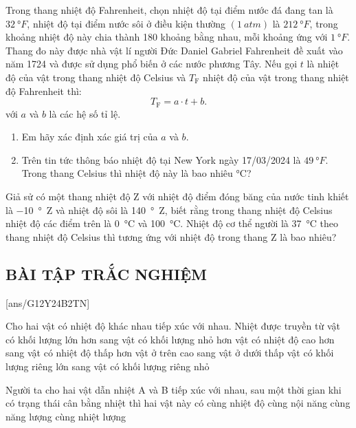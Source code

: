 \begin{vd}
	Trong thang nhiệt độ Fahrenheit, chọn nhiệt độ tại điểm nước đá đang tan là $\SI{32}{\degree F}$, nhiệt độ tại điểm nước sôi ở điều kiện thường $\left(\SI{1}{atm}\right)$ là $\SI{212}{\degree F}$, trong khoảng nhiệt độ này chia thành 180 khoảng bằng nhau, mỗi khoảng ứng với $\SI{1}{\degree F}$. Thang đo này được nhà vật lí người Đức Daniel Gabriel Fahrenheit đề xuất vào năm 1724 và được sử dụng phổ biến ở các nước phương Tây. Nếu gọi $t$ là nhiệt độ của vật trong thang nhiệt độ Celsius và $T_\text{F}$ nhiệt độ của vật trong thang nhiệt độ Fahrenheit thì:
	$$T_\text{F}=a\cdot t+b.$$
	với $a$ và $b$ là các hệ số tỉ lệ.
	\begin{enumerate}[label=\alph*)]
		\item Em hãy xác định xác giá trị của $a$ và $b$.
		\item Trên tin tức thông báo nhiệt độ tại New York ngày 17/03/2024 là $\SI{49}{\degree F}$. Trong thang Celsius thì nhiệt độ này là bao nhiêu $\si{\celsius}$?
	\end{enumerate}
\end{vd}
\begin{vd}
	Giả sử có một thang nhiệt độ Z với nhiệt độ điểm đóng băng của nước tinh khiết là \SI{-10}{\degree Z} và nhiệt độ sôi là \SI{140}{\degree Z}, biết rằng trong thang nhiệt độ Celsius nhiệt độ các điểm trên là \SI{0}{\celsius} và \SI{100}{\celsius}. Nhiệt độ cơ thể người là \SI{37}{\celsius} theo thang nhiệt độ Celsius thì tương ứng với nhiệt độ trong thang Z là bao nhiêu?
 \end{vd}
\subsection{BÀI TẬP TRẮC NGHIỆM}
[ans/G12Y24B2TN]
\begin{ex}
	Cho hai vật có nhiệt độ khác nhau tiếp xúc với nhau. Nhiệt được truyền từ
	\choice
	{vật có khối lượng lớn hơn sang vật có khối lượng nhỏ hơn}
	{\True vật có nhiệt độ cao hơn sang vật có nhiệt độ thấp hơn}
	{vật ở trên cao sang vật ở dưới thấp}
	{vật có khối lượng riêng lớn sang vật có khối lượng riêng nhỏ}
	\loigiai{

}
	\end{ex}
\begin{ex}
Người ta cho hai vật dẫn nhiệt A và B tiếp xúc với nhau, sau một thời gian khi có trạng thái cân bằng nhiệt thì hai vật này có
	\choice
	{\True cùng nhiệt độ}
	{cùng nội năng}
	{cùng năng lượng}
	{cùng nhiệt lượng}
	\loigiai{
	
}
\end{ex}

